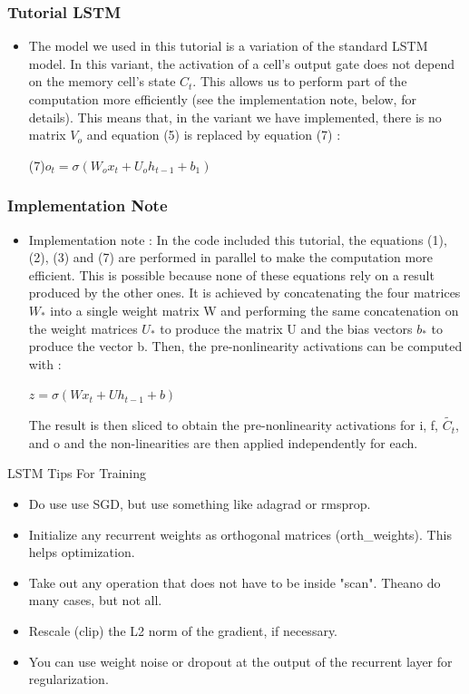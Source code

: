 \documentclass[utf8x,xcolor=pdftex,dvipsnames,table]{beamer}
\begin{document}
\begin{frame}
  \frametitle{Tutorial LSTM}
\begin{itemize}
\item The model we used in this tutorial is a variation of the standard LSTM model. In this variant, the activation of a cell’s output gate does not depend on the memory cell’s state $C_t$. This allows us to perform part of the computation more efficiently (see the implementation note, below, for details). This means that, in the variant we have implemented, there is no matrix $V_o$ and equation (5) is replaced by equation (7) :

(7)$o_t = \sigma(W_o x_t + U_o h_{t-1} + b_1)$

\end{itemize}
\end{frame}

\begin{frame}
  \frametitle{Implementation Note}
\begin{itemize}
\item Implementation note : In the code included this tutorial, the equations (1), (2), (3) and (7) are performed in parallel to make the computation more efficient. This is possible because none of these equations rely on a result produced by the other ones. It is achieved by concatenating the four matrices $W_*$ into a single weight matrix W and performing the same concatenation on the weight matrices $U_*$ to produce the matrix U and the bias vectors $b_*$ to produce the vector b. Then, the pre-nonlinearity activations can be computed with :

$z = \sigma(W x_t + U h_{t-1} + b)$

The result is then sliced to obtain the pre-nonlinearity activations for i, f, $\widetilde{C_t}$, and o and the non-linearities are then applied independently for each.
\end{itemize}
\end{frame}

\begin{frame}{LSTM Tips For Training}
\begin{itemize}
\item Do use use SGD, but use something like adagrad or rmsprop.
\item Initialize any recurrent weights as orthogonal matrices (orth\_weights). This helps optimization.
\item Take out any operation that does not have to be inside "scan".
      Theano do many cases, but not all.
\item Rescale (clip) the L2 norm of the gradient, if necessary.
\item You can use weight noise or dropout at the output of the recurrent layer for regularization.
\end{itemize}
\end{frame}
\end{document}
